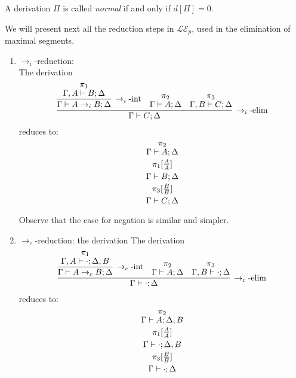 \begin{definition}
A derivation $\Pi$ is called {\em normal} if and only if $d[\Pi ] = 0$.
\end{definition}
We will present next all the reduction steps in $\mathcal{LE}_{p}$, used in the elimination of maximal segments.
\begin{enumerate}
\item $\to_{i}$-reduction:\\

The derivation
\[
\infer[\iimpe]{\stp{\Gamma}{C}{\Delta}}
{\infer[\iimpi]{\stp{\Gamma}{A\iimp B}{\Delta}}
{\deduce{\stp{\Gamma,A}{B}{\Delta}}{\pi_1}}&
\deduce{\stp{\Gamma}{A}{\Delta}}{\pi_2}&
\deduce{\stp{\Gamma,B}{C}{\Delta}}{\pi_3}}
\]
reduces to:
\[
\deduce{\stp{\Gamma}{C}{\Delta}}
{\deduce{}
{\deduce{\pi_3[\frac{B}{B}]}
{\deduce{}
{\deduce{\stp{\Gamma}{B}{\Delta}}
{\deduce{}
{\deduce{\pi_1[\frac{A}{A}]}
{\deduce{}
{\deduce{\stp{\Gamma}{A}{\Delta}}{\pi_2}}}}}}}}}
\]

Observe that the case for negation is similar and simpler.

\item $\to_{c}$-reduction: the derivation
The derivation
\[
\infer[\cimpe]{\stp{\Gamma}{\cdot}{\Delta}}
{\infer[\cimpi]{\stp{\Gamma}{A\cimp B}{\Delta}}
{\deduce{\stp{\Gamma,A}{\cdot}{\Delta,B}}{\pi_1}}&
\deduce{\stp{\Gamma}{A}{\Delta}}{\pi_2}&
\deduce{\stp{\Gamma,B}{\cdot}{\Delta}}{\pi_3}}
\]
reduces to:
\[
\deduce{\stp{\Gamma}{\cdot}{\Delta}}
{\deduce{}
{\deduce{\pi_3[\frac{B}{B}]}
{\deduce{}
{\deduce{\stp{\Gamma}{\cdot}{\Delta,B}}
{\deduce{}
{\deduce{\pi_1[\frac{A}{A}]}
{\deduce{}
{\deduce{\stp{\Gamma}{A}{\Delta,B}}{\pi_2}}}}}}}}}
\]
\end{enumerate}


